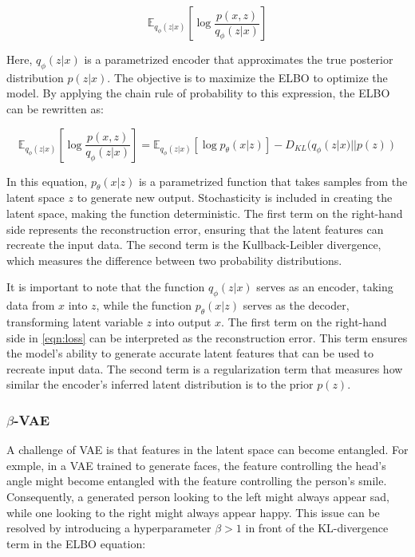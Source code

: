 \begin{equation}\label{eqn:elbo}
 \mathbb{E}_{q_\phi(z|x)}\left[\log \frac{p(x,z)}{q_\phi(z|x)}  \right]
\end{equation}


Here, $q_\phi(z|x)$ is a parametrized encoder that approximates the true posterior distribution $p(z|x)$. The objective is to maximize the ELBO to optimize the model. By applying the chain rule of probability to this expression, the ELBO can be rewritten as:

\begin{equation}\label{eqn:loss}
 \mathbb{E}_{q_\phi(z|x)}\left[\log \frac{p(x,z)}{q_\phi(z|x)}  \right]
 = \mathbb{E}_{q_\phi(z|x)}[\log p_\theta (x|z)] -D_{KL}(q_\phi(z|x)||p(z))
\end{equation}

In this equation, $p_\theta(x|z)$ is a parametrized function that takes samples from the latent space $z$ to generate new output. Stochasticity is included in creating the latent space, making the function deterministic. The first term on the right-hand side represents the reconstruction error, ensuring that the latent features can recreate the input data. The second term is the Kullback-Leibler divergence, which measures the difference between two probability distributions.

It is important to note that the function $q_\phi(z|x)$ serves as an encoder, taking data from $x$ into $z$, while the function $p_\theta(x|z)$ serves as the decoder, transforming latent variable $z$ into output $x$. The first term on the right-hand side in \autoref{eqn:loss} can be interpreted as the reconstruction error. This term ensures the model's ability to generate accurate latent features that can be used to recreate input data. The second term is a regularization term that measures how similar the encoder's inferred latent distribution is to the prior $p(z)$. 

\subsubsection{$\beta$-VAE}

A challenge of VAE is that features in the latent space can become entangled. For exmple, in a VAE trained to generate faces, the feature controlling the head's angle might become entangled with the feature controlling the person's smile. Consequently, a generated person looking to the left might always appear sad, while one looking to the right might always appear happy. This issue can be resolved by introducing a hyperparameter $\beta >1$ in front of the KL-divergence term in the ELBO equation:

